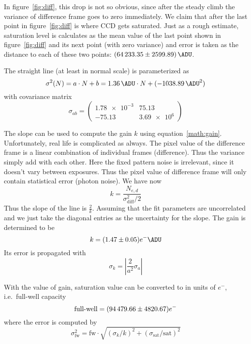 In figure~\ref{fig:diff}, this drop is not so obvious, since after the steady climb the variance of difference frame goes to zero immediately. We claim that after the last point in figure~\ref{fig:diff} is where CCD gets saturated. Just as a rough estimate, saturation level is calculates as the mean value of the last point shown in figure~\ref{fig:diff} and its next point (with zero variance) and error is taken as the distance to each of these two points: $\SI{64233. 35+- 2599.89}{\ADU}$.

The straight line (at least in normal scale) is parameterized as
\begin{equation*}
	\sigma^2 (N) = a\cdot N + b = \SI{1.36}{\ADU} \cdot N + (\SI{-1038.89}{\ADU\tothe{2}})
\end{equation*}
with covariance matrix
\begin{equation}
	\sigma_{ab} = \begin{pmatrix}  \num{1.78e-3} & \num{75.13} \\ \num{-75.13} & \num{3.69e6}\end{pmatrix}
\end{equation}

The slope can be used to compute the gain $k$ using equation~\ref{math:gain}. Unfortunately, real life is complicated as always. The pixel value of the difference frame is a linear combination of individual frames (difference). Thus the variance simply add with each other. Here the fixed pattern noise is irrelevant, since it doesn't vary between exposures. Thus the pixel value of difference frame will only contain statistical error (photon noise). We have now
\begin{equation}
	k = \frac{N_{e,d}}{ \sigma^2_{\text{diff}}/2}
\end{equation}
Thus the slope of the line is $\frac{2}{k}$. Assuming that the fit parameters are uncorrelated and we just take the diagonal entries as the uncertainty for the slope. The gain is determined to be
\begin{equation}
	k = (\num{1.47 +- 0.05} ) e^{-}\si{\per\ADU}
\end{equation}
Its error is propagated with
\begin{equation*}
	\sigma_k = \left| \frac{2}{a^2} \sigma_a \right|
\end{equation*}

With the value of gain, saturation value can be converted to in units of $e^{-}$, i.e.~full-well capacity
\begin{equation}
	\text{full-well} = (\num{94479.66 +- 4820.67}) e^-
\end{equation}
where the error is computed by
\begin{equation*}
	\sigma^2_\text{fw} = \text{fw} \cdot \sqrt{(\sigma_k/k)^2 + (\sigma_\text{sat}/\text{sat})^2}
\end{equation*}

